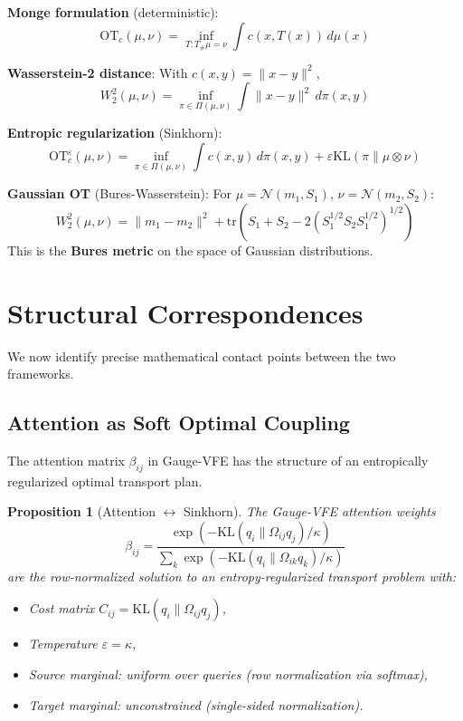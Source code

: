 \documentclass[11pt]{article}
\newtheorem{proposition}{Proposition}
\newcommand{\KL}{\mathrm{KL}}
\newcommand{\OT}{\mathrm{OT}}
\newcommand{\tr}{\mathrm{tr}}
\begin{document}
\textbf{Monge formulation} (deterministic):
\begin{equation}
\OT_c(\mu,\nu) = \inf_{T: T_\#\mu = \nu} \int c(x, T(x))\,d\mu(x)
\end{equation}

\textbf{Wasserstein-2 distance}: With $c(x,y) = \|x-y\|^2$,
\begin{equation}
W_2^2(\mu,\nu) = \inf_{\pi \in \Pi(\mu,\nu)} \int \|x - y\|^2\,d\pi(x,y)
\end{equation}

\textbf{Entropic regularization} (Sinkhorn):
\begin{equation}\label{eq:sinkhorn}
\OT_c^\varepsilon(\mu,\nu) = \inf_{\pi \in \Pi(\mu,\nu)} \int c(x,y)\,d\pi(x,y) + \varepsilon \KL(\pi \| \mu \otimes \nu)
\end{equation}

\textbf{Gaussian OT} (Bures-Wasserstein): For $\mu = \mathcal{N}(m_1, S_1)$, $\nu = \mathcal{N}(m_2, S_2)$:
\begin{equation}\label{eq:bures}
W_2^2(\mu,\nu) = \|m_1 - m_2\|^2 + \tr\!\left(S_1 + S_2 - 2(S_1^{1/2} S_2 S_1^{1/2})^{1/2}\right)
\end{equation}
This is the \textbf{Bures metric} on the space of Gaussian distributions.


\section{Structural Correspondences}

We now identify precise mathematical contact points between the two frameworks.

\subsection{Attention as Soft Optimal Coupling}

The attention matrix $\beta_{ij}$ in Gauge-VFE has the structure of an entropically regularized optimal transport plan.

\begin{proposition}[Attention $\leftrightarrow$ Sinkhorn]\label{prop:attention-sinkhorn}
The Gauge-VFE attention weights
\[
\beta_{ij} = \frac{\exp(-\KL(q_i \| \Omega_{ij}q_j)/\kappa)}{\sum_k \exp(-\KL(q_i \| \Omega_{ik}q_k)/\kappa)}
\]
are the row-normalized solution to an entropy-regularized transport problem with:
\begin{itemize}
    \item Cost matrix $C_{ij} = \KL(q_i \| \Omega_{ij}q_j)$,
    \item Temperature $\varepsilon = \kappa$,
    \item Source marginal: uniform over queries (row normalization via softmax),
    \item Target marginal: unconstrained (single-sided normalization).
\end{itemize}
\end{proposition}
\end{document}
